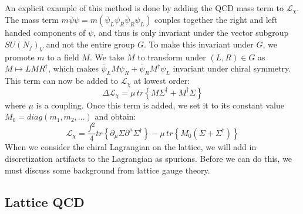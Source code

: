 \documentclass[11pt, oneside]{article}   	%
\theoremstyle{definition}
\begin{document}
An explicit example of this method is done by adding the QCD mass term to $\mathcal L_\chi$. The mass term $m\overline 
\psi \psi = m(\overline\psi_L\psi_R \overline\psi_R\psi_L)$ couples together the right and left handed components of $\psi$, 
and thus is only invariant under the vector subgroup $SU(N_f)_V$ and not the entire group $G$. To make this invariant 
under $G$, we promote $m$ to a field $M$. We take $M$ to transform under $(L, R)\in G$ as $M\mapsto L M R^\dagger$, 
which makes $\overline\psi_L M\psi_R + \overline\psi_R M^\dagger \psi_L$ invariant under chiral symmetry. This term 
can now be added to $\mathcal L_\chi$ at lowest order:
\begin{equation}
	\Delta\mathcal L_\chi = \mu\, tr\left\{M\Sigma^\dagger + M^\dagger\Sigma\right\}
\end{equation}
where $\mu$ is a coupling. Once this term is added, we set it to its constant value $M_0 = diag(m_1, m_2, ...)$ and obtain:
\begin{equation}
	\mathcal L_\chi = \frac{f^2}{4} tr\left\{\partial_\mu\Sigma\partial^\mu\Sigma^\dagger\right\} - \mu\,tr\left\{
	M_0\left(\Sigma + \Sigma^\dagger\right)\right\}
\end{equation}
When we consider the chiral Lagrangian on the lattice, we will add in discretization artifacts to the Lagrangian as spurions.
Before we can do this, we must discuss some background from lattice gauge theory.

\subsection{Lattice QCD}
\end{document}

